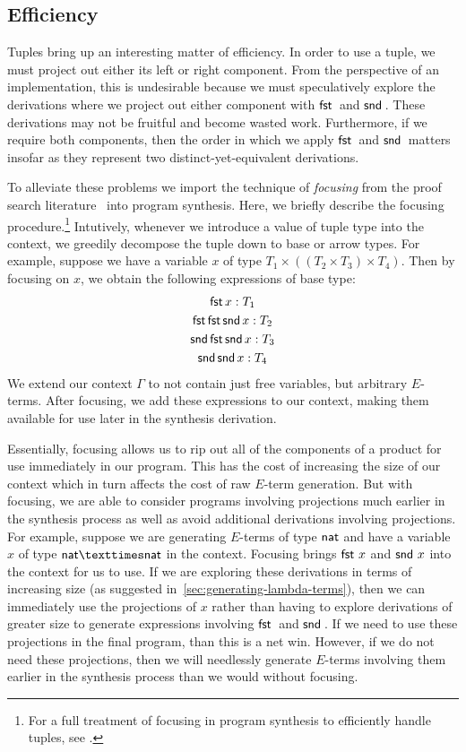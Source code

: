 \subsection{Efficiency}
\label{subsec:tuple-efficiency}

Tuples bring up an interesting matter of efficiency.
In order to use a tuple, we must project out either its left or right component.
From the perspective of an implementation, this is undesirable because we must speculatively explore the derivations where we project out either component with $\mfst$ and $\msnd$.
These derivations may not be fruitful and become wasted work.
Furthermore, if we require both components, then the order in which we apply $\mfst$ and $\msnd$ matters insofar as they represent two distinct-yet-equivalent derivations.

To alleviate these problems we import the technique of \emph{focusing} from the proof search literature~\citep{liang-csl-2007} into program synthesis.
Here, we briefly describe the focusing procedure.\footnote{%
  For a full treatment of focusing in program synthesis to efficiently handle tuples, see \citet{frankle-mastersthesis-2015}.
}
Intutively, whenever we introduce a value of tuple type into the context, we greedily decompose the tuple down to base or arrow types.
For example, suppose we have a variable $x$ of type $T_1 × ((T_2 × T_3) × T_4)$.
Then by focusing on $x$, we obtain the following expressions of base type:
\begin{gather*}
  \mathsf{fst}\,x : T_1 \\
  \mathsf{fst}\,\mathsf{fst}\,\mathsf{snd}\,x : T_2 \\
  \mathsf{snd}\,\mathsf{fst}\,\mathsf{snd}\,x : T_3 \\
  \mathsf{snd}\,\mathsf{snd}\,x : T_4
\end{gather*}
We extend our context $Γ$ to not contain just free variables, but arbitrary $E$-terms.
After focusing, we add these expressions to our context, making them available for use later in the synthesis derivation.

Essentially, focusing allows us to rip out all of the components of a product for use immediately in our program.
This has the cost of increasing the size of our context which in turn affects the cost of raw $E$-term generation.
But with focusing, we are able to consider programs involving projections much earlier in the synthesis process as well as avoid additional derivations involving projections.
For example, suppose we are generating $E$-terms of type $\mathsf{nat}$ and have a variable $x$ of type $\mnat × \mnat$ in the context.
Focusing brings $\mathsf{fst}\,\,x$ and $\mathsf{snd}\,\,x$ into the context for us to use.
If we are exploring these derivations in terms of increasing size (as suggested in~\autoref{sec:generating-lambda-terms}), then we can immediately use the projections of $x$ rather than having to explore derivations of greater size to generate expressions involving $\mfst$ and $\msnd$.
If we need to use these projections in the final program, than this is a net win.
However, if we do not need these projections, then we will needlessly generate $E$-terms involving them earlier in the synthesis process than we would without focusing.

